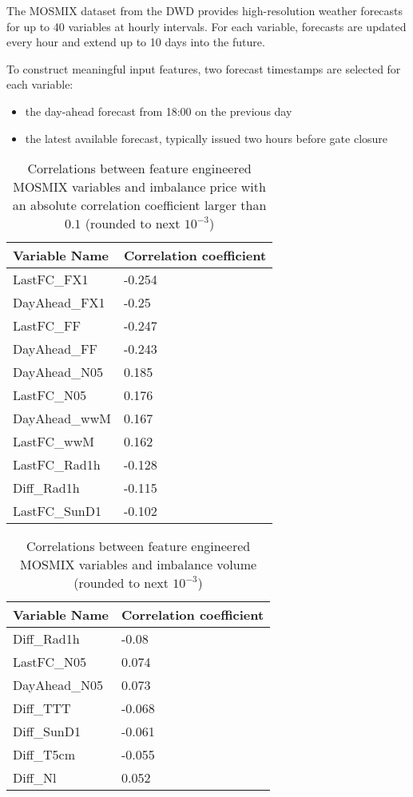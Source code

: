 \documentclass[class=scrbook, crop=false]{standalone}
\begin{document}
The MOSMIX dataset from the \gls{DWD} provides high-resolution weather forecasts for up to 40 variables at hourly intervals. For each variable, forecasts are updated every hour and extend up to 10 days into the future.

To construct meaningful input features, two forecast timestamps are selected for each variable:
\begin{itemize}
\item the day-ahead forecast from 18:00 on the previous day 
\item the latest available forecast, typically issued two hours before gate closure
\end{itemize}
    
    \begin{table}[h]
    \centering
    \begin{tabular}{l|l}
    Variable Name	& Correlation coefficient \\\hline
   	LastFC\_FX1	&-0.254\\
	DayAhead\_FX1	&-0.25\\
	LastFC\_FF		&-0.247\\
	DayAhead\_FF 	&-0.243\\
	DayAhead\_N05	&0.185\\
	LastFC\_N05	&0.176\\
	DayAhead\_wwM	&0.167\\
	LastFC\_wwM	&0.162\\
	LastFC\_Rad1h 	&-0.128\\
	Diff\_Rad1h          	&-0.115\\
	LastFC\_SunD1     	&-0.102\\
    \end{tabular}
    
    \caption{Correlations between feature engineered MOSMIX variables and imbalance price with an absolute correlation coefficient larger than $0.1$ (rounded to next $10^{-3}$)}
    \label{Table::imbalance_price_MOSMIX_correlations}
    \end{table}
    
    \begin{table}[h]
    \centering
    \begin{tabular}{l|l}
    Variable Name	& Correlation coefficient \\\hline
	Diff\_Rad1h                          &-0.08\\
	LastFC\_N05                          &0.074\\
	DayAhead\_N05                        &0.073\\
	Diff\_TTT                           &-0.068\\
	Diff\_SunD1                         &-0.061\\
	Diff\_T5cm                          &-0.055\\
	Diff\_Nl                             &0.052\\
    \end{tabular}
    
    \caption{Correlations between feature engineered MOSMIX variables and imbalance volume (rounded to next $10^{-3}$)}
    \label{Table::imbalance_volume_MOSMIX_correlations}
    \end{table}
    
\end{document}
